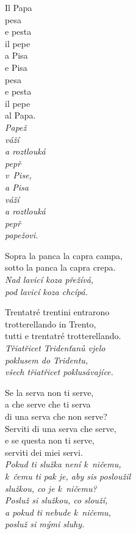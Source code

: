 \medskip

\noindent
Il Papa \\
pesa \\
e pesta \\
il pepe \\
a Pisa \\
e Pisa \\
pesa \\
e pesta \\
il pepe \\
al Papa. \\
\textit{Papež  \\ váží  \\ a roztlouká   \\ pepř  \\ v Pise,  \\ a Pisa  \\ váží  \\ a roztlouká   \\ pepř  \\ papežovi.}

\medskip

\noindent
Sopra la panca la capra campa, \\
sotto la panca la capra crepa. \\
\textit{Nad lavicí koza přežívá, \\ pod lavicí koza chcípá.}

\medskip

\noindent
Trentatré trentini entrarono \\
trotterellando in Trento, \\
tutti e trentatré trotterellando. \\
\textit{Třiatřicet Tridenťanů vjelo \\ poklusem do Tridentu,  \\ všech třiatřicet poklusávajíce.}

\medskip

\noindent
Se la serva non ti serve, \\
a che serve che ti serva \\
di una serva che non serve? \\
Serviti di una serva che serve, \\
e se questa non ti serve, \\
serviti dei miei servi. \\
\textit{Pokud ti služka není k ničemu, \\ k čemu ti pak je, aby sis posloužil \\ služkou, co je k ničemu? \\ Posluž si služkou, co slouží, \\ a pokud ti nebude k~ničemu,  \\ posluž si mými sluhy. }

